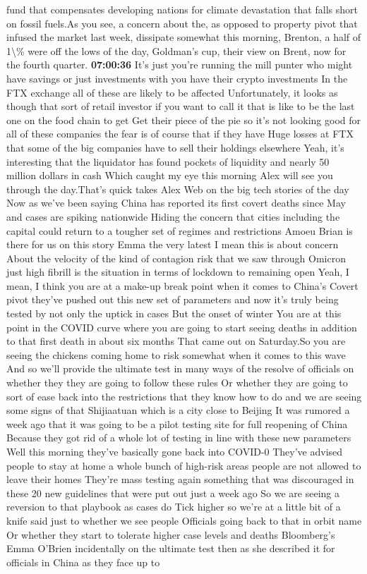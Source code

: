 \documentclass{article}%
\begin{document}
fund that compensates developing nations for climate devastation that falls short on fossil fuels.As you see, a concern about the, as opposed to property pivot that infused the market last week, dissipate somewhat this morning, Brenton, a half of 1\textbackslash{}\% were off the lows of the day, Goldman's cup, their view on Brent, now for the fourth quarter.%
\textbf{07:00:36}%
\newline%
It's just you're running the mill punter who might have savings or just investments with you have their crypto investments In the FTX exchange all of these are likely to be affected Unfortunately, it looks as though that sort of retail investor if you want to call it that is like to be the last one on the food chain to get Get their piece of the pie so it's not looking good for all of these companies the fear is of course that if they have Huge losses at FTX that some of the big companies have to sell their holdings elsewhere Yeah, it's interesting that the liquidator has found pockets of liquidity and nearly 50 million dollars in cash Which caught my eye this morning Alex will see you through the day.That's quick takes Alex Web on the big tech stories of the day Now as we've been saying China has reported its first covert deaths since May and cases are spiking nationwide Hiding the concern that cities including the capital could return to a tougher set of regimes and restrictions Amoeu Brian is there for us on this story Emma the very latest I mean this is about concern About the velocity of the kind of contagion risk that we saw through Omicron just high fibrill is the situation in terms of lockdown to remaining open Yeah, I mean, I think you are at a make{-}up break point when it comes to China's Covert pivot they've pushed out this new set of parameters and now it's truly being tested by not only the uptick in cases But the onset of winter You are at this point in the COVID curve where you are going to start seeing deaths in addition to that first death in about six months That came out on Saturday.So you are seeing the chickens coming home to risk somewhat when it comes to this wave And so we'll provide the ultimate test in many ways of the resolve of officials on whether they they are going to follow these rules Or whether they are going to sort of ease back into the restrictions that they know how to do and we are seeing some signs of that Shijiaatuan which is a city close to Beijing It was rumored a week ago that it was going to be a pilot testing site for full reopening of China Because they got rid of a whole lot of testing in line with these new parameters Well this morning they've basically gone back into COVID{-}0 They've advised people to stay at home a whole bunch of high{-}risk areas people are not allowed to leave their homes They're mass testing again something that was discouraged in these 20 new guidelines that were put out just a week ago So we are seeing a reversion to that playbook as cases do Tick higher so we're at a little bit of a knife said just to whether we see people Officials going back to that in orbit name Or whether they start to tolerate higher case levels and deaths Bloomberg's Emma O'Brien incidentally on the ultimate test then as she described it for officials in China as they face up to 
\end{document}
